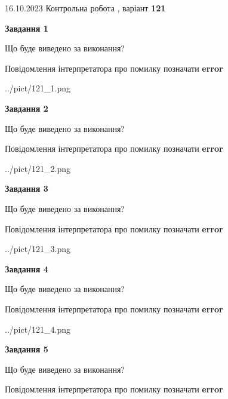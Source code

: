 \documentclass[12pt, ukrainian]{article}
\begin{document}
{\Large{16.10.2023 Контрольна робота , варіант  \No \textbf { 121 }\par}}
{
\begin {large}
{\begin {center}\textbf{Завдання 1}\end {center}}\par
Що буде виведено за виконання? \par
Повідомлення інтерпретатора про помилку позначати \textbf{error}

\begin{center}
	{../pict/121_1.png}
\end{center}
\newpage

{\begin {center}\textbf{Завдання 2}\end {center}}\par
Що буде виведено за виконання? \par
Повідомлення інтерпретатора про помилку позначати \textbf{error}

\begin{center}
	{../pict/121_2.png}
\end{center}
\newpage

{\begin {center}\textbf{Завдання 3}\end {center}}\par
Що буде виведено за виконання? \par
Повідомлення інтерпретатора про помилку позначати \textbf{error}

\begin{center}
	{../pict/121_3.png}
\end{center}
\newpage

{\begin {center}\textbf{Завдання 4}\end {center}}\par
Що буде виведено за виконання? \par
Повідомлення інтерпретатора про помилку позначати \textbf{error}

\begin{center}
	{../pict/121_4.png}
\end{center}
\newpage

{\begin {center}\textbf{Завдання 5}\end {center}}\par
Що буде виведено за виконання? \par
Повідомлення інтерпретатора про помилку позначати \textbf{error}


\end{large}}
\end{document}
